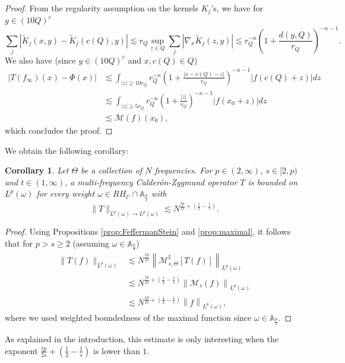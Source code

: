 \documentclass[11pt]{amsart}
\newtheorem{corollary}[theorem]{Corollary}
\theoremstyle{remark}
\newcommand{\mb}{\medskip\noindent}
\newcommand{\M}{{\mathcal M}}
\begin{document}
\begin{proof}
From the regularity assumption on the kernels $K_j$'s, we have for $y\in (10 Q)^c$
\begin{equation} \sum_{j} \left| \widetilde{K}_{j}(x,y) - \widetilde{K}_j(c(Q),y) \right| \lesssim r_Q \sup_{z\in Q} \sum_j \left| \nabla_{x} \widetilde{K}_{j}(z,y)\right| \lesssim r_Q^{-n}\left(1+\frac{d(y,Q)}{r_Q}\right)^{-n-1}. \label{eq:kernel} \end{equation}
We also have (since $y\in (10 Q)^c$ and $x,c(Q)\in Q$)
\begin{align*}
 \left| T(f_\infty)(x) -\Phi(x)\right| & \lesssim  \int_{|z|\geq 10 r_Q} r_Q^{-n}\left(1+\frac{|x-c(Q)-z|}{r_Q}\right)^{-n-1} |f(c(Q)+z)| dz \\
 & \lesssim \int_{|z|\geq 5 r_Q} r_Q^{-n}\left(1+\frac{|z|}{r_Q}\right)^{-n-1} |f(x_0+z)| dz \\
 & \lesssim {\mathcal M}(f)(x_0),
\end{align*}
which concludes the proof.
\end{proof}

We obtain the following corollary:

\begin{corollary} \label{cor} Let $\Theta$ be a collection of $N$ frequencies. For $p\in (2,\infty)$, $s\in[2,p)$ and $t\in(1,\infty)$, a multi-frequency Calder\'on-Zygmund operator $T$ is bounded on $L^p(\omega)$ for every weight $\omega \in RH_{t'} \cap {\mathbb A}_{\frac{p}{s}}$ with
$$ \|T\|_{L^p(\omega) \to L^p(\omega)} \lesssim N^{\frac{tp}{2s}+\left(\frac{1}{2}-\frac{1}{s}\right)}.$$
\end{corollary}

\begin{proof} Using Propositions \ref{prop:FeffermanStein} and \ref{prop:maximal}, it follows that for $p>s\geq 2$ (assuming $\omega \in {\mathbb A}_{\frac{p}{s}}$)
\begin{align*} \|T(f) \|_{L^p(\omega)} & \lesssim N^{\frac{tp}{2s}} \left\| \M_{s,\Theta}^\sharp [T(f)] \right\|_{L^p(\omega)} \\
& \lesssim N^{\frac{tp}{2s}+\left(\frac{1}{2}-\frac{1}{s}\right)}  \left\| {\mathcal M}_s(f) \right\|_{L^p(\omega)} \\
& \lesssim N^{\frac{tp}{2s}+\left(\frac{1}{2}-\frac{1}{s}\right)}  \left\| f \right\|_{L^p(\omega)},
\end{align*}
where we used weighted boundedness of the maximal function since $\omega \in {\mathbb A}_{\frac{p}{s}}$.
\end{proof}

\mb As explained in the introduction, this estimate is only interesting when the exponent $\frac{tp}{2s}+\left(\frac{1}{2}-\frac{1}{s}\right)$ is lower than $1$.
\end{document}
